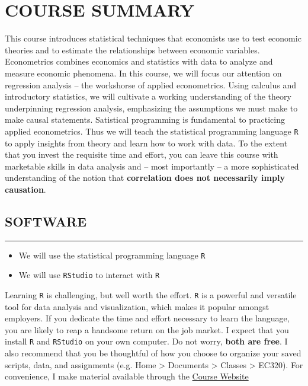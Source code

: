 \section*{COURSE SUMMARY}

This course introduces statistical techniques that economists use to test economic theories and to estimate the relationships between economic variables. 
Econometrics combines economics and statistics with data to analyze and measure economic phenomena. 
In this course, we will focus our attention on regression analysis -- the workshorse of applied econometrics. 
Using calculus and introductory statistics, we will cultivate a working understanding of the theory underpinning regression analysis, emphasizing the assumptions we must make to make causal statements. 
Satistical programming is fundamental to practicing applied econometrics. 
Thus we will teach the statistical programming language \texttt{R} to apply insights from theory and learn how to work with data.
To the extent that you invest the requisite time and effort, you can leave this course with marketable skills in data analysis and -- most importantly -- a more sophisticated understanding of the notion that \textbf{correlation does not necessarily imply causation}.

\subsection*{SOFTWARE}
\vspace*{-0.5cm}
\rule{\textwidth}{2pt}

\begin{itemize}
    \item We will use the statistical programming language \texttt{R}
    \item We will use \texttt{RStudio} to interact with \texttt{R}
\end{itemize}

Learning \texttt{R} is challenging, but well worth the effort. 
\texttt{R} is a powerful and versatile tool for data analysis and visualization, which makes it popular amongst employers.
If you dedicate the time and effort necessary to learn the language, you are likely to reap a handsome return on the job market. 
I expect that you install \texttt{R} and \texttt{RStudio} on your own computer.
Do not worry, \textbf{both are free}. 
I also recommend that you be thoughtful of how you choose to organize your saved scripts, data, and assignments (e.g. Home > Documents > Classes > EC320).
For convenience, I make material available through the \hyperlink{https://jrojas1003.github.io/EC-320-Intro-Econometrics/}{Course Website}

